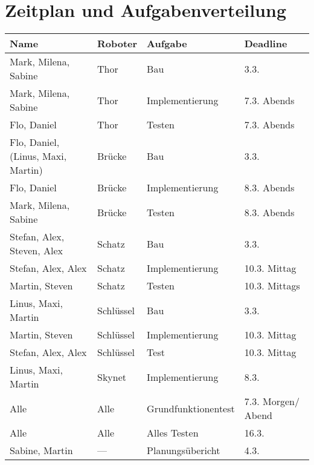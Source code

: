 \documentclass[a4paper]{scrartcl}
\begin{document}
	\section{Zeitplan und Aufgabenverteilung}
	\begin{tabularx}{\linewidth}{|l|l|l|l|}
		\hline
		\sfb Name & \sfb Roboter & \sfb Aufgabe & \sfb Deadline \\
		\hline
		Mark, Milena, Sabine & Thor & Bau & 3.3. \\
		Mark, Milena, Sabine & Thor & Implementierung & 7.3. Abends \\
		Flo, Daniel & Thor & Testen & 7.3. Abends \\
		Flo, Daniel, (Linus, Maxi, Martin) & Brücke & Bau & 3.3. \\
		Flo, Daniel & Brücke & Implementierung & 8.3. Abends \\
		Mark, Milena, Sabine & Brücke & Testen & 8.3. Abends \\
		Stefan, Alex, Steven, Alex & Schatz & Bau & 3.3. \\
		Stefan, Alex, Alex & Schatz & Implementierung & 10.3. Mittag \\
		Martin, Steven & Schatz & Testen & 10.3. Mittags \\
		Linus, Maxi, Martin & Schlüssel & Bau & 3.3. \\
		Martin, Steven & Schlüssel & Implementierung & 10.3. Mittag \\
		Stefan, Alex, Alex & Schlüssel & Test & 10.3. Mittag \\
		Linus, Maxi, Martin & Skynet & Implementierung & 8.3. \\
		Alle & Alle & Grundfunktionentest & 7.3. Morgen/ Abend \\
		Alle & Alle & Alles Testen & 16.3. \\
		Sabine, Martin & --- & Planungsübericht & 4.3. \\
		\hline
	\end{tabularx}
\end{document}
